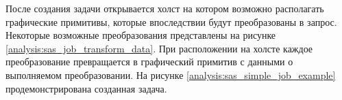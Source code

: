 \begin{figure}[ht!]
\end{figure}

\newpage

После создания задачи открывается холст на котором возможно располагать графические примитивы, которые впоследствии 
будут преобразованы в запрос. %
Некоторые возможные преобразования представлены на рисунке \ref{analysis:sas_job_transform_data}. 
При расположении на холсте каждое преобразование превращается в графический 
примитив с данными о выполняемом преобразовании.
На рисунке \ref{analysis:sas_simple_job_example} продемонстрирована созданная задача.

\begin{figure}[ht!]
\end{figure}

